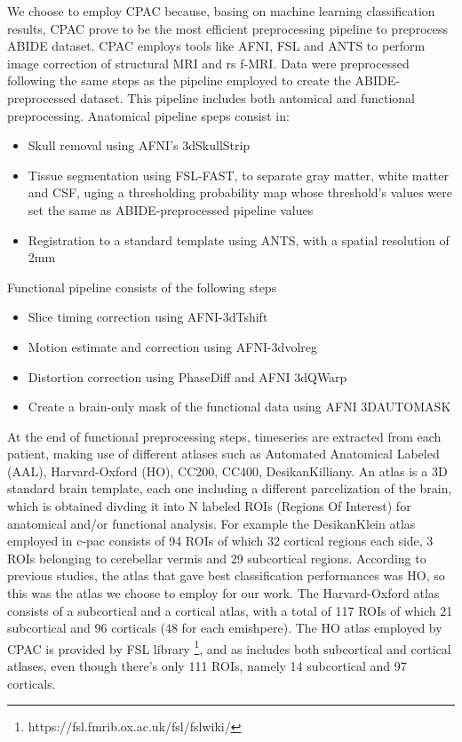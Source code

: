\documentclass[a4paper,11pt]{article}
\begin{document}
We choose to employ CPAC because, basing on machine learning classification results, \cite{Yang2020} CPAC prove to be the most efficient preprocessing pipeline to preprocess ABIDE dataset.
CPAC employs tools like AFNI, FSL and ANTS to perform image correction of structural MRI and rs f-MRI.
Data were preprocessed following the same steps as the pipeline employed to create the ABIDE-preprocessed dataset.
This pipeline includes both antomical and functional preprocessing.
Anatomical pipeline speps consist in:
\begin{itemize}
\item Skull removal using AFNI's 3dSkullStrip
\item Tissue segmentation using FSL-FAST, to separate gray matter, white matter and CSF, uging a thresholding probability map whose threshold's values were set the same as ABIDE-preprocessed pipeline values
\item Registration to a standard template using ANTS, with a spatial resolution of 2mm
\end{itemize}
Functional pipeline consists of the following steps
\begin{itemize}
\item Slice timing correction using AFNI-3dTshift
\item Motion estimate and correction using AFNI-3dvolreg
\item Distortion correction using PhaseDiff and AFNI 3dQWarp
\item Create a brain-only mask of the functional data using AFNI 3DAUTOMASK
\end{itemize}
At the end of functional preprocessing steps, timeseries are extracted from each patient, making use of different atlases such as Automated Anatomical Labeled (AAL), Harvard-Oxford (HO), CC200, CC400, DesikanKilliany.
An atlas is a 3D standard brain template, each one including a different parcelization of the brain, which is obtained divding it into N labeled ROIs (Regions Of Interest) for anatomical and/or functional analysis.
For example the DesikanKlein atlas employed in c-pac consists of 94 ROIs of which 32 cortical regions each side, 3 ROIs belonging to cerebellar vermis and 29 subcortical regions.
According to previous studies, the atlas that gave best classification performances was HO, so this was the atlas we choose to employ for our work.
The Harvard-Oxford atlas consists of a subcortical and a cortical atlas, with a total of 117 ROIs of which 21 subcortical and 96 corticals (48 for each emishpere).
The HO atlas employed by CPAC is provided by FSL library \footnote{https://fsl.fmrib.ox.ac.uk/fsl/fslwiki/}, and as includes both subcortical and cortical atlases, even though there's only 111 ROIs, namely 14 subcortical and 97 corticals.
\end{document}
